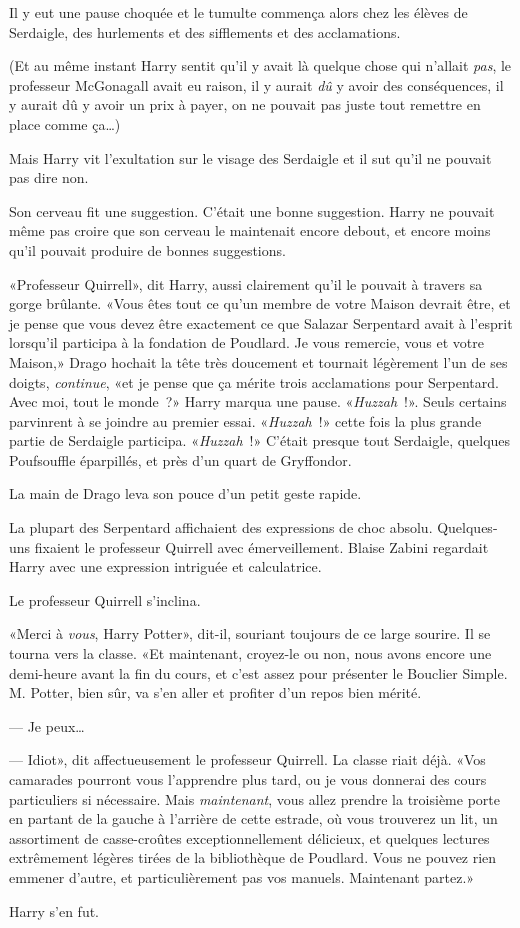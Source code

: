 Il y eut une pause choquée et le tumulte commença alors chez les élèves de Serdaigle, des hurlements et des sifflements et des acclamations.

(Et au même instant Harry sentit qu'il y avait là quelque chose qui n'allait \emph{pas}, le professeur McGonagall avait eu raison, il y aurait \emph{dû} y avoir des conséquences, il y aurait dû y avoir un prix à payer, on ne pouvait pas juste tout remettre en place comme ça…)

Mais Harry vit l'exultation sur le visage des Serdaigle et il sut qu'il ne pouvait pas dire non.

Son cerveau fit une suggestion. C'était une bonne suggestion. Harry ne pouvait même pas croire que son cerveau le maintenait encore debout, et encore moins qu'il pouvait produire de bonnes suggestions.

«Professeur Quirrell», dit Harry, aussi clairement qu'il le pouvait à travers sa gorge brûlante. «Vous êtes tout ce qu'un membre de votre Maison devrait être, et je pense que vous devez être exactement ce que Salazar Serpentard avait à l'esprit lorsqu'il participa à la fondation de Poudlard. Je vous remercie, vous et votre Maison,» Drago hochait la tête très doucement et tournait légèrement l'un de ses doigts, \emph{continue}, «et je pense que ça mérite trois acclamations pour Serpentard. Avec moi, tout le monde~?» Harry marqua une pause. «\emph{Huzzah}~!». Seuls certains parvinrent à se joindre au premier essai. «\emph{Huzzah}~!» cette fois la plus grande partie de Serdaigle participa. «\emph{Huzzah}~!» C'était presque tout Serdaigle, quelques Poufsouffle éparpillés, et près d'un quart de Gryffondor.

La main de Drago leva son pouce d'un petit geste rapide.

La plupart des Serpentard affichaient des expressions de choc absolu. Quelques-uns fixaient le professeur Quirrell avec émerveillement. Blaise Zabini regardait Harry avec une expression intriguée et calculatrice.

Le professeur Quirrell s'inclina.

«Merci à \emph{vous}, Harry Potter», dit-il, souriant toujours de ce large sourire. Il se tourna vers la classe. «Et maintenant, croyez-le ou non, nous avons encore une demi-heure avant la fin du cours, et c'est assez pour présenter le Bouclier Simple. M. Potter, bien sûr, va s'en aller et profiter d'un repos bien mérité.

--- Je peux…

--- Idiot», dit affectueusement le professeur Quirrell. La classe riait déjà. «Vos camarades pourront vous l'apprendre plus tard, ou je vous donnerai des cours particuliers si nécessaire. Mais \emph{maintenant}, vous allez prendre la troisième porte en partant de la gauche à l'arrière de cette estrade, où vous trouverez un lit, un assortiment de casse-croûtes exceptionnellement délicieux, et quelques lectures extrêmement légères tirées de la bibliothèque de Poudlard. Vous ne pouvez rien emmener d'autre, et particulièrement pas vos manuels. Maintenant partez.»

Harry s'en fut.
